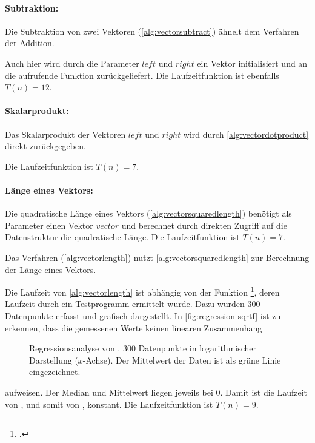 
\paragraph{Subtraktion:} %
\label{par:subtraktion}

Die Subtraktion von zwei Vektoren (\autoref{alg:vectorsubtract}) ähnelt dem Verfahren der Addition.

Auch hier wird durch die Parameter $\mathit{left}$ und $\mathit{right}$ ein Vektor initialisiert und an die
 aufrufende Funktion zurückgeliefert. Die Laufzeitfunktion ist ebenfalls $T(n) = 12$.


\paragraph{Skalarprodukt:} %
\label{par:skalarprodukt}

Das Skalarprodukt der Vektoren $\mathit{left}$ und $\mathit{right}$ wird durch \autoref{alg:vectordotproduct} direkt
 zurückgegeben.

Die Laufzeitfunktion ist $T(n) = 7$.


\paragraph{Länge eines Vektors:} %
\label{par:länge_eines_vektors}

Die quadratische Länge eines Vektors (\autoref{alg:vectorsquaredlength}) benötigt als Parameter einen Vektor
 $\mathit{vector}$ und berechnet durch direkten Zugriff auf die Datenstruktur die quadratische Länge. Die
 Laufzeitfunktion ist $T(n) = 7$.

Das Verfahren  (\autoref{alg:vectorlength}) nutzt \autoref{alg:vectorsquaredlength} zur Berechnung der
 Länge eines Vektors.

Die Laufzeit von \autoref{alg:vectorlength} ist abhängig von der Funktion \footcite[Vgl.][]{sqrtf},
 deren Laufzeit durch ein Testprogramm ermittelt wurde. Dazu wurden $300$ Datenpunkte erfasst und grafisch dargestellt.
 In \autoref{fig:regression-sqrtf} ist zu erkennen, dass die gemessenen Werte keinen linearen Zusammenhang
\begin{figure}[!ht]
	\centering
	
	\caption{Regressionsanalyse von . $300$ Datenpunkte in logarithmischer Darstellung ($x$-Achse). Der
	 Mittelwert der Daten ist als grüne Linie eingezeichnet.}
	\label{fig:regression-sqrtf}
\end{figure}
 aufweisen. Der Median und Mittelwert liegen jeweils bei $0$. Damit ist die Laufzeit von , und somit von
 , konstant. Die Laufzeitfunktion ist $T(n) = 9$.

